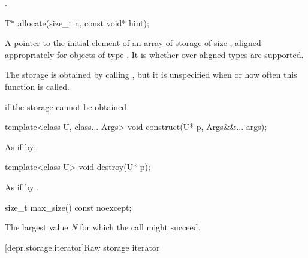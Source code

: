 \begin{itemdescr}
\pnum
\returns {}.
\end{itemdescr}

%
\begin{itemdecl}
T* allocate(size_t n, const void* hint);
\end{itemdecl}

\begin{itemdescr}
\pnum
\returns
A pointer to the initial element of an array of storage of size 
, aligned appropriately for objects of type .
It is  whether over-aligned types are
supported.

\pnum
\remarks
The storage is obtained by calling ,
but it is unspecified when or how often this function is called.

\pnum
\throws
{} if the storage cannot be obtained.
\end{itemdescr}

%
\begin{itemdecl}
template<class U, class... Args>
  void construct(U* p, Args&&... args);
\end{itemdecl}

\begin{itemdescr}
\pnum
\effects
As if by: 
\end{itemdescr}

%
\begin{itemdecl}
template<class U>
  void destroy(U* p);
\end{itemdecl}

\begin{itemdescr}
\pnum
\effects
As if by .
\end{itemdescr}

%
\begin{itemdecl}
size_t max_size() const noexcept;
\end{itemdecl}

\begin{itemdescr}
\pnum
\returns
The largest value \textit{N} for which the call 
might succeed.
\end{itemdescr}

[depr.storage.iterator]{Raw storage iterator}

